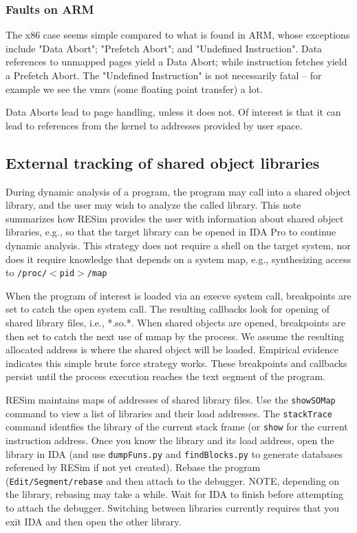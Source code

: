 \documentclass[titlepage]{article}
\begin{document}
\begin{appendices}
\subsubsection{Faults on ARM}
The x86 case seems simple compared to what is found in ARM, whose exceptions include "Data Abort"; "Prefetch Abort"; and "Undefined Instruction".  
Data references to unmapped pages yield a Data Abort; while instruction fetches yield a Prefetch Abort.  The "Undefined Instruction" is not necessarily fatal --
for example we see the vmrs (some floating point transfer) a lot.

Data Aborts lead to page handling, unless it does not.  Of interest is that it can lead to references from the kernel to addresses provided by user space.

\subsection{External tracking of shared object libraries}
\label{shared-libraries}
During dynamic analysis of a program, the program may call into a shared object library, and the user may wish to analyze the called library.  This note summarizes how RESim provides the user with information about shared object libraries, e.g., so that the target library can be opened in IDA Pro to continue dynamic analysis.  This strategy does not require a shell on the target system, nor does it require knowledge that depends on a system map, e.g., 
synthesizing access to {\tt /proc/$<$pid$>$/map}

When the program of interest is loaded via an execve system call, breakpoints are set to catch the open system call.  The resulting callbacks look for opening of shared library files, i.e., *.so.*.   When shared objects are opened, breakpoints are then set to catch the next use of mmap by the process.  We assume the resulting allocated address is where the shared object will be loaded.  Empirical evidence indicates this simple brute force strategy works.  These breakpoints and callbacks persist until the process execution reaches the text segment of the program.

RESim maintains maps of addresses of shared library files.  Use the {\tt showSOMap} command to view a list of libraries and their load
addresses.  The {\tt stackTrace} command identfies the library of the current stack frame (or {\tt show} for the current instruction address.
Once you know the library and its load address, open the library in IDA (and use {\tt dumpFuns.py} and {\tt findBlocks.py} to generate databases
referened by RESim if not yet created). Rebase the program ({\tt Edit/Segment/rebase} and then attach to the debugger. NOTE, depending on the library, rebasing may take a while.
Wait for IDA to finish before attempting to attach the debugger.
Switching between libraries currently requires that you exit IDA and then open the other library.


\end{appendices}
\end{document}
